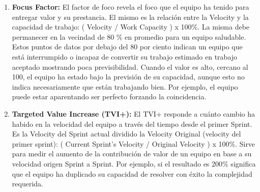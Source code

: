 \begin{enumerate}
{  \begin{enumerate}
  
  \item {\textbf{Capacidad en puntos ideales:} La capacidad puede ser una idealización basada en la velocidad promedio, o sea, los puntos de la historia que se pueden considerar gastar en la próxima carrera de velocidad.\footnote{\cite{Satish-Thatte-2013}}}

  \item {\textbf{Capacidad en horas:} La capacidad puede ser calculada en horas basados en la cantidad de miembros y la cantidad de horas efectivas de trabajo en un Sprint. Por ejemplo en un equipo de 8 miembros, con 6 horas de trabajo efectivo y un Sprint de 10 días, la capacidad en horas es igual a 480 hs (8 x 6 hs x 10).}

  \end{enumerate}

Cuando se definió el marco de trabajo, como algo mínimo de cosas para que funcione, se dejó lo más simple posible. Debido a ello, el concepto de Velocity es partes del marco de trabajo aceptada por la comunidad, pero Working capacity no lo es del todo aceptado, aunque es ampliamente usado.
}

\item {\textbf{Focus Factor:} El factor de foco revela el foco que el equipo ha tenido para entregar valor y su prestancia. El mismo es la relación entre la Velocity y la capacidad de trabajo: ( Velocity / Work Capacity ) x 100\%. La misma debe permanecer en la vecindad de 80 \% en promedio para un equipo saludable. Estos puntos de datos por debajo del 80 por ciento indican un equipo que está interrumpido o incapaz de convertir su trabajo estimado en trabajo aceptado mostrando poca previsibilidad. Cuando el valor es alto, cercano al 100, el equipo ha estado bajo la previsión de su capacidad, aunque esto no indica necesariamente que están trabajando bien. Por ejemplo, el equipo puede estar aparentando ser perfecto forzando la coincidencia.}

\item {\textbf{Targeted Value Increase (TVI+):} El TVI+ responde a cuánto cambio ha habido en la velocidad del equipo a través del tiempo desde el primer Sprint. Es la Velocity del Sprint actual dividido la Velocity Original (velocity del primer sprint): ( Current Sprint’s Velocity / Original Velocity ) x 100\%. Sirve para medir el aumento de la contribución de valor de un equipo en base a su velocidad origen Sprint a Sprint.
Por ejemplo, si el resultado es 200\% significa que el equipo ha duplicado su capacidad de resolver con éxito la complejidad requerida.
}


\end{enumerate}
